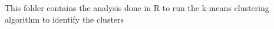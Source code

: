 This folder contains the analysis done in R to run the k-means clustering algorithm to identify the clusters
